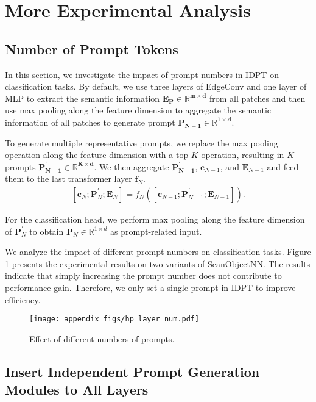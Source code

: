 \documentclass[10pt,twocolumn,letterpaper]{article}
\begin{document}
\clearpage
\appendix
\section{More Experimental Analysis}

\subsection{Number of Prompt Tokens}

In this section, we investigate the impact of prompt numbers in IDPT on classification tasks. By default, we use three layers of EdgeConv \cite{wang2019dynamic} and one layer of MLP to extract the semantic information $\bm{E_P\in \mathbb{R}^{m\times d}}$ from all patches and then use max pooling along the feature dimension to aggregate the semantic information of all patches to generate prompt $\bm{P_{N-1}\in \mathbb{R}^{1\times d}}$. 

To generate multiple representative prompts, we replace the max pooling operation along the feature dimension with a top-$K$ operation, resulting in $K$ prompts $\bm{P_{N-1}^{'}\in \mathbb{R}^{K\times d}}$. We then aggregate $\bm{P_{N-1}^{'}}$, $\bm c_{N-1}$, and $\bm E_{N-1}$ and feed them to the last transformer layer $\bm f_N$.
\begin{gather}
    \label{eq12}
    [\bm c_N; {\bm P_{N}^{'}}; \bm E_N] = f_N([\bm c_{N-1}; {\bm P_{N-1}^{'}}; \bm E_{N-1}]).
\end{gather}

For the classification head, we perform max pooling along the feature dimension of $\bm P_{N}^{'}$ to obtain $\bm P_{N}\in \mathbb{R}^{1\times d}$ as prompt-related input. 

We analyze the impact of different prompt numbers on classification tasks. Figure \ref{layer_num} presents the experimental results on two variants of ScanObjectNN. The results indicate that simply increasing the prompt number does not contribute to performance gain.  Therefore, we only set a single prompt in IDPT to improve efficiency.

\begin{figure}[h]
\centering
\texttt{[image: appendix\_figs/hp\_layer\_num.pdf]} 
\caption{Effect of different numbers of prompts.}
\label{layer_num}
\end{figure}

\subsection{Insert Independent Prompt Generation Modules to All Layers}
\end{document}
